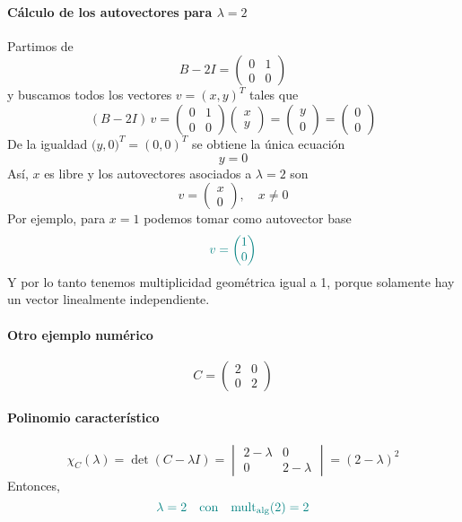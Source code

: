 \documentclass{article}
\begin{document}
\paragraph*{Cálculo de los autovectores para \(\lambda=2\)}

Partimos de
\[
B - 2I = \begin{pmatrix}
0 & 1\\
0 & 0
\end{pmatrix}
\]
y buscamos todos los vectores \(v=(x,y)^T\) tales que
\[
(B - 2I)\,v = \begin{pmatrix}
0 & 1\\
0 & 0
\end{pmatrix}
\begin{pmatrix}x\\y\end{pmatrix}
= \begin{pmatrix}
y\\
0
\end{pmatrix}
= \begin{pmatrix}0\\0\end{pmatrix}
\]
De la igualdad \(\bigl(y,0\bigr)^T=(0,0)^T\) se obtiene la única ecuación
\[
y = 0
\]
Así, \(x\) es libre y los autovectores asociados a \(\lambda=2\) son
\[
v = \begin{pmatrix}x\\0\end{pmatrix},
\quad x\neq 0
\]
Por ejemplo, para \(x=1\) podemos tomar como autovector base
\[
\color{teal}
v = \begin{pmatrix}1\\0\end{pmatrix}
\]
Y por lo tanto tenemos multiplicidad geométrica igual a 1, porque solamente hay un vector linealmente independiente.


\paragraph*{Otro ejemplo numérico}


\[
  C = \begin{pmatrix}
    2 & 0\\
    0 & 2
  \end{pmatrix}
\]

\paragraph*{Polinomio característico}

\[
\chi_C(\lambda) = \det(C - \lambda I)
= \begin{vmatrix}
2-\lambda & 0\\
0 & 2-\lambda
\end{vmatrix}
= (2 - \lambda)^2
\]
Entonces,
\[
\color{teal}
\lambda = 2 \quad \text{con} \quad \mathrm{mult}_{\mathrm{alg}}(2) = 2
\]
\end{document}
